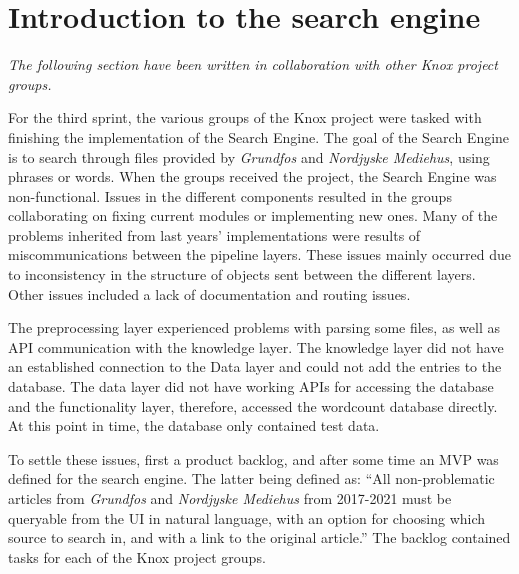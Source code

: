 \section{Introduction to the search engine}\label{SHARED-search-engine}
\textit{The following section have been written in collaboration with other Knox project groups.}

For the third sprint, the various groups of the Knox project were tasked with finishing the implementation of the Search Engine. The goal of the Search Engine is to search through files provided by \textit{Grundfos} and \textit{Nordjyske Mediehus}, using phrases or words. When the groups received the project, the Search Engine was non-functional. Issues in the different components resulted in the groups collaborating on fixing current modules or implementing new ones. Many of the problems inherited from last years' implementations were results of miscommunications between the pipeline layers. These issues mainly occurred due to inconsistency in the structure of objects sent between the different layers. Other issues included a lack of documentation and routing issues. 

The preprocessing layer experienced problems with parsing some files, as well as API communication with the knowledge layer. The knowledge layer did not have an established connection to the Data layer and could not  add the entries to the database. The data layer did not have working APIs for accessing the database and the functionality layer, therefore, accessed the wordcount database directly. At this point in time, the database only contained test data.

To settle these issues, first a product backlog, and after some time an MVP was defined for the search engine. The latter being defined as: “All non-problematic articles from \textit{Grundfos} and \textit{Nordjyske Mediehus} from 2017-2021 must be queryable from the UI in natural language, with an option for choosing which source to search in, and with a link to the original article.” 
The backlog contained tasks for each of the Knox project groups.